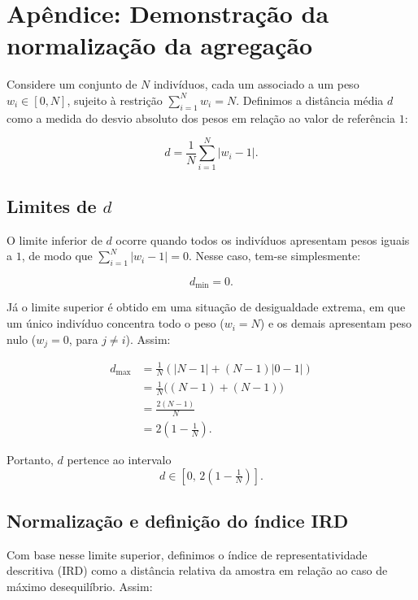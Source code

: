\appendix
\section{Apêndice: Demonstração da normalização da agregação}
\label{appendix:ird}

Considere um conjunto de $N$ indivíduos, cada um associado a um peso $w_i \in [0,N]$, sujeito à restrição $\sum_{i=1}^{N} w_i = N$. 
Definimos a distância média $d$ como a medida do desvio absoluto dos pesos em relação ao valor de referência $1$:

\begin{equation}
    d = \frac{1}{N} \sum_{i=1}^{N} |w_i - 1|.
\end{equation}

\subsection*{Limites de $d$}

O limite inferior de $d$ ocorre quando todos os indivíduos apresentam pesos iguais a $1$, de modo que $\sum_{i=1}^{N} |w_i - 1| = 0$. Nesse caso, tem-se simplesmente:

\[
d_{\min} = 0.
\]

Já o limite superior é obtido em uma situação de desigualdade extrema, em que um único indivíduo concentra todo o peso ($w_i = N$) e os demais apresentam peso nulo ($w_j = 0$, para $j \neq i$). Assim:

\begin{equation}
    \begin{aligned}
        d_{\max} &= \frac{1}{N} \left(|N - 1| + (N-1) |0 - 1|\right) \\
        &= \frac{1}{N} \big((N - 1) + (N-1)\big) \\
        &= \frac{2(N - 1)}{N} \\
        &= 2 \left(1 - \tfrac{1}{N}\right).
    \end{aligned}
\end{equation}

Portanto, $d$ pertence ao intervalo
\[
d \in \left[0,\, 2\left(1 - \tfrac{1}{N}\right)\right].
\]

\subsection*{Normalização e definição do índice IRD}

Com base nesse limite superior, definimos o índice de representatividade descritiva (IRD) como a distância relativa da amostra em relação ao caso de máximo desequilíbrio. Assim:

